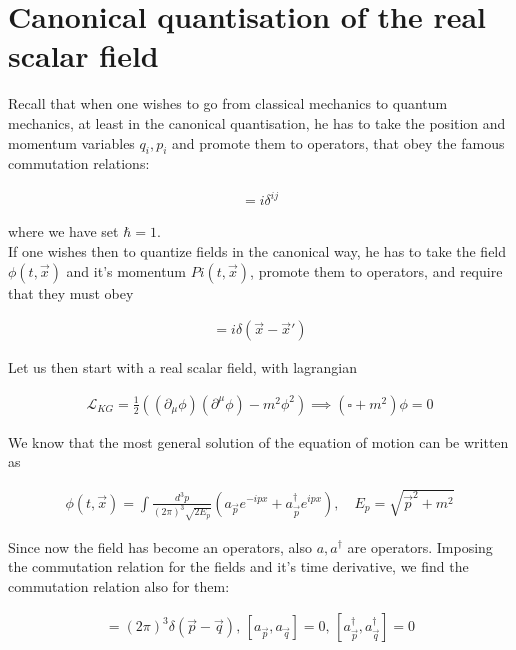 \documentclass{report}
\begin{document}
\section{Canonical quantisation of the real scalar field}

Recall that when one wishes to go from classical mechanics to quantum mechanics, at least in the canonical quantisation, he has to take the position and momentum variables \(q_i, p_i\) and promote them to operators, that obey the famous commutation relations: 

\begin{align}
    [q_i, p_j] = i\delta^{ij}
\end{align}

where we have set \(\hbar = 1\). \\

If one wishes then to quantize fields in the canonical way, he has to take the field \(\phi(t, \vec{x})\) and it's momentum \(Pi(t, \vec{x})\), promote them to operators, and require that they must obey 

\begin{align}
    [\phi(t, \vec{x}), \Pi(t, \vec{x}')] = i\delta(\vec{x}-\vec{x}')
\end{align}

Let us then start with a real scalar field, with lagrangian 

\begin{align}
    \mathcal{L}_{KG} = \frac{1}{2}((\partial_\mu \phi)(\partial^\mu \phi)-m^2\phi^2) \implies (\square +m^2)\phi = 0 
\end{align}

We know that the most general solution of the equation of motion can be written as 

\begin{align}
    \phi(t, \vec{x}) = \int \frac{d^3p}{(2\pi)^3\sqrt{2E_p}}(a_{\vec{p}}e^{-ipx}+a_{\vec{p}}^\dagger e^{ipx}), \quad E_p = \sqrt{\vec{p}^2 + m^2}
\end{align}

Since now the field has become an operators, also \(a, a^\dagger\) are operators. Imposing the commutation relation for the fields and it's time derivative, we find the commutation relation also for them: 

\begin{align}
    [a_{\vec{p}}, a^\dagger_{\vec{q}}] = (2\pi)^3\delta(\vec{p}-\vec{q}), \,  [a_{\vec{p}}, a_{\vec{q}}] = 0, \, [a^\dagger_{\vec{p}}, a^\dagger_{\vec{q}}] = 0
\end{align}
\end{document}
